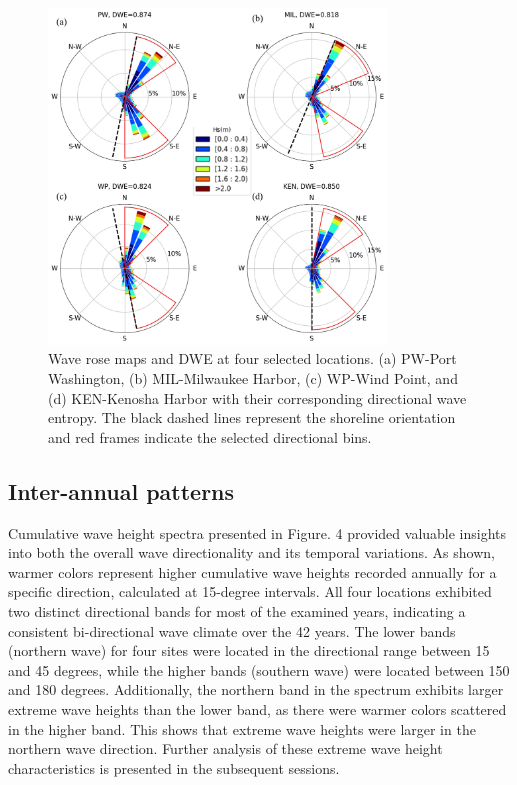 \begin{figure}[htbp]
  \centering
  \includegraphics[width=0.8\textwidth]{chapter3/resources/figure3-3.jpg}
  \caption{Wave rose maps and DWE at four selected locations. (a) PW-Port Washington, (b) MIL-Milwaukee Harbor, (c) WP-Wind Point, and (d) KEN-Kenosha Harbor with their corresponding directional wave entropy. The black dashed lines represent the shoreline orientation and red frames indicate the selected directional bins.}
  \label{fig:fig3.3}
\end{figure}

\subsection{Inter-annual patterns}
\label{c3_Inter-annual patterns}
Cumulative wave height spectra presented in Figure. 4 provided valuable insights into both the overall wave directionality and its temporal variations. As shown, warmer colors represent higher cumulative wave heights recorded annually for a specific direction, calculated at 15-degree intervals. All four locations exhibited two distinct directional bands for most of the examined years, indicating a consistent bi-directional wave climate over the 42 years. The lower bands (northern wave) for four sites were located in the directional range between 15 and 45 degrees, while the higher bands (southern wave) were located between 150 and 180 degrees. Additionally, the northern band in the spectrum exhibits larger extreme wave heights than the lower band, as there were warmer colors scattered in the higher band. This shows that extreme wave heights were larger in the northern wave direction. Further analysis of these extreme wave height characteristics is presented in the subsequent sessions.

